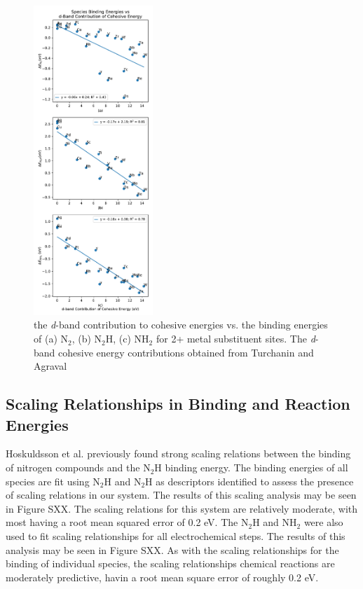 \begin{figure}
    \centering
    \includegraphics[width=0.4\textwidth]{Images/species_cohesive.pdf}
    \caption{the \textit{d}-band contribution to cohesive energies vs. the binding energies of (a) N$_2$, (b) N$_2$H, (c) NH$_2$ for 2+ metal substituent sites. The \textit{d}-band cohesive energy contributions obtained from Turchanin and Agraval \cite{Turchanin_2008}}
    \label{fig:cohesive}
\end{figure}

\subsection{Scaling Relationships in Binding and Reaction Energies}
\label{sec:scaling}

Hoskuldsson et al. \cite{Hoskuldsson_2017} previously found strong scaling relations between the binding of nitrogen compounds and the N$_2$H binding energy.  The binding energies of all species are fit using N$_2$H and N$_2$H as descriptors identified to assess the presence of scaling relations in our system. The results of this scaling analysis may be seen in Figure SXX. The scaling relations for this system are relatively moderate, with most having a root mean squared error of 0.2 eV. The N$_2$H and NH$_2$ were also used to fit scaling relationships for all electrochemical steps. The results of this analysis may be seen in Figure SXX. As with the scaling relationships for the binding of individual species, the scaling relationships chemical reactions are moderately predictive, havin a root mean square error of roughly 0.2 eV.

